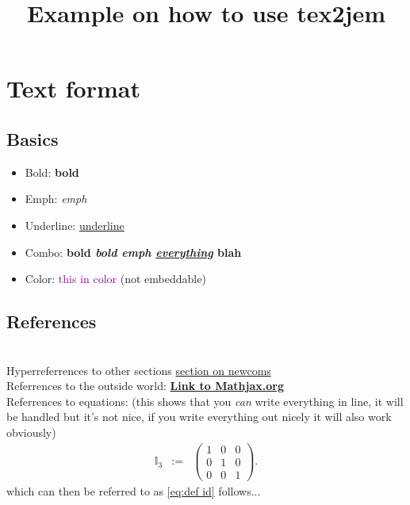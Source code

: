 

\newcommand{\bcite}[1]{\href{#1}{\textbf{Link}.}}
\newcommand{\RR}{$\mathbb R$}
\newcommand{\eqa}[1]{\begin{eqnarray}#1\end{eqnarray}}

\title{Example on how to use tex2jem}


\maketitle

\section{Text format}
\subsection{Basics}
\begin{itemize}
    \item Bold: \textbf{bold}
    \item Emph: \emph{emph}
    \item Underline: \underline{underline}
    \item Combo: \textbf{bold \emph{bold emph \underline{everything}} blah}
    \item Color: \textcolor{DarkMagenta}{this in color} (not embeddable)
\end{itemize}

\subsection{References}\\
Hyperreferrences to other sections \hyperref[sec:newcom]{section on newcoms}\\
Referrences to the outside world: \href{http://www.mathjax.org}{\textbf{Link to Mathjax.org}}\\
Referrences to equations: (this shows that you \emph{can} write everything in line, it will be handled but it's not nice, if you write everything out nicely it will also work obviously)
\eqa{ \mathbb I_3 &:=& \left(\begin{array}{ccc}1&0&0\\0&1&0\\0&0&1 \end{array}\right).\label{eq:def id}}
which can then be referred to as \eqref{eq:def id} follows...\\

